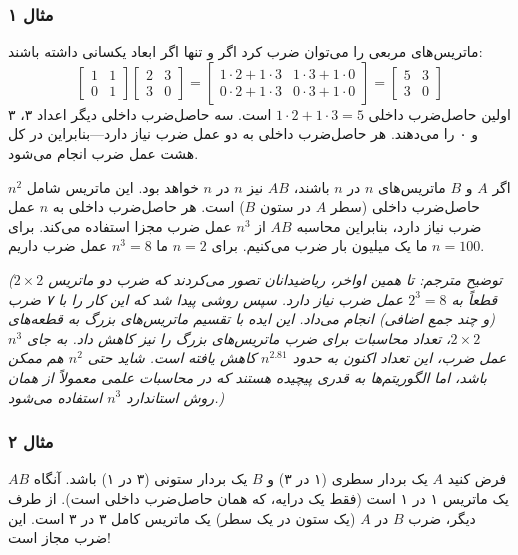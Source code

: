 \documentclass[12pt, a4paper]{book}
\begin{document}
	\subsubsection*{مثال ۱}
	ماتریس‌های مربعی را می‌توان ضرب کرد اگر و تنها اگر ابعاد یکسانی داشته باشند:
	\[
	\begin{bmatrix} 1 & 1 \\ 0 & 1 \end{bmatrix}
	\begin{bmatrix} 2 & 3 \\ 3 & 0 \end{bmatrix}
	=
	\begin{bmatrix} 1 \cdot 2 + 1 \cdot 3 & 1 \cdot 3 + 1 \cdot 0 \\ 0 \cdot 2 + 1 \cdot 3 & 0 \cdot 3 + 1 \cdot 0 \end{bmatrix}
	=
	\begin{bmatrix} 5 & 3 \\ 3 & 0 \end{bmatrix}
	\]
	اولین حاصل‌ضرب داخلی $1 \cdot 2 + 1 \cdot 3 = 5$ است. سه حاصل‌ضرب داخلی دیگر اعداد ۳، ۳ و ۰ را می‌دهند. هر حاصل‌ضرب داخلی به دو عمل ضرب نیاز دارد—بنابراین در کل هشت عمل ضرب انجام می‌شود.
	
	اگر $A$ و $B$ ماتریس‌های $n$ در $n$ باشند، $AB$ نیز $n$ در $n$ خواهد بود. این ماتریس شامل $n^2$ حاصل‌ضرب داخلی (سطر $A$ در ستون $B$) است. هر حاصل‌ضرب داخلی به $n$ عمل ضرب نیاز دارد، بنابراین محاسبه $AB$ از $n^3$ عمل ضرب مجزا استفاده می‌کند. برای $n=100$ ما یک میلیون بار ضرب می‌کنیم. برای $n=2$ ما $n^3=8$ عمل ضرب داریم.
	
	\textit{(توضیح مترجم: تا همین اواخر، ریاضیدانان تصور می‌کردند که ضرب دو ماتریس $2 \times 2$ قطعاً به $2^3 = 8$ عمل ضرب نیاز دارد. سپس روشی پیدا شد که این کار را با ۷ ضرب (و چند جمع اضافی) انجام می‌داد. این ایده با تقسیم ماتریس‌های بزرگ به قطعه‌های $2 \times 2$، تعداد محاسبات برای ضرب ماتریس‌های بزرگ را نیز کاهش داد. به جای $n^3$ عمل ضرب، این تعداد اکنون به حدود $n^{2.81}$ کاهش یافته است. شاید حتی $n^2$ هم ممکن باشد، اما الگوریتم‌ها به قدری پیچیده هستند که در محاسبات علمی معمولاً از همان روش استاندارد $n^3$ استفاده می‌شود.)}
	
	\subsubsection*{مثال ۲}
	فرض کنید $A$ یک بردار سطری (۱ در ۳) و $B$ یک بردار ستونی (۳ در ۱) باشد. آنگاه $AB$ یک ماتریس ۱ در ۱ است (فقط یک درایه، که همان حاصل‌ضرب داخلی است). از طرف دیگر، ضرب $B$ در $A$ (یک ستون در یک سطر) یک ماتریس کامل ۳ در ۳ است. این ضرب مجاز است!
	
\end{document}
